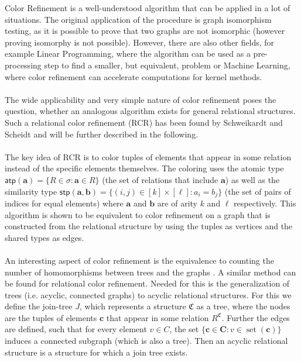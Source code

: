 \documentclass[a4paper,11pt,DIV=15]{scrartcl} %
\theoremstyle{plain}
\theoremstyle{definition}
\begin{document}
Color Refinement is a well-understood algorithm that can be applied in a lot of situations.
The original application of the procedure is graph isomorphism testing, as it is possible to prove that two graphs are not isomorphic (however proving isomorphy is not possible).
However, there are also other fields, for example Linear Programming, where the algorithm can be used as a pre-processing step to find a smaller, but equivalent, problem or Machine Learning, where color refinement can accelerate computations for kernel methods. \cite{grohe2021color}
\\ \\
The wide applicability and very simple nature of color refinement poses the question, whether an analogous algorithm exists for general relational structures.
Such a relational color refinement (RCR) has been found by Schweikardt and Scheidt \cite{scheidt2024color} and will be further described in the following.
\\ \\
The key idea of RCR is to color tuples of elements that appear in some relation instead of the specific elements themselves. 
The coloring uses the atomic type $\mathsf{atp}(\mathbf{a})=\{R\in\sigma : \mathbf{a}\in R\}$ (the set of relations that include $\mathbf{a}$) as well as the similarity type $\mathsf{stp}(\mathbf{a},\mathbf{b})=\{(i,j)\in[k]\times[\ell] : a_i=b_j\}$ (the set of pairs of indices for equal elements) where $\mathbf{a}$ and $\mathbf{b}$ are of arity $k$ and $\ell$ respectively.
This algorithm is shown to be equivalent to color refinement on a graph that is constructed from the relational structure by using the tuples as vertices and the shared types as edges.
\\ \\
An interesting aspect of color refinement is the equivalence to counting the number of homomorphisms between trees and the graphs \cite{dvovrak2010recognizing}. A similar method can be found for relational color refinement.
Needed for this is the generalization of trees (i.e. acyclic, connected graphs) to acyclic relational structures.
For this we define the join-tree $J$, which represents a structure $\mathfrak C$ as a tree, where the nodes are the tuples of elements $\mathbf c$ that appear in some relation $R^\mathfrak C$. Further the edges are defined, such that for every element $v\in C$, the set $\{\mathbf{c}\in \mathbf{C} : v\in\operatorname{set}(\mathbf c)\}$ induces a connected subgraph (which is also a tree).
Then an acyclic relational structure is a structure for which a join tree exists.
\end{document}

